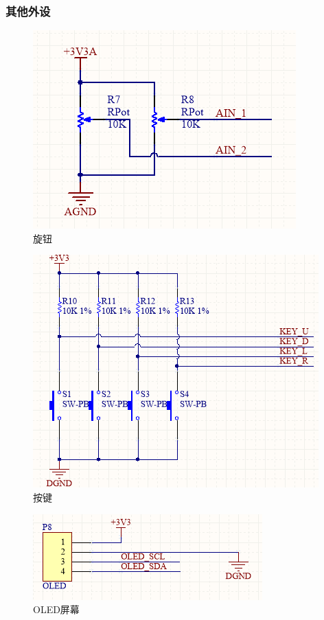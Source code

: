 \documentclass[16pt,a4paper]{article}
\begin{document}
\subsubsection{其他外设}
\begin{figure}[H]
\centering
\includegraphics[scale = 0.8]{Rpot.png}
\caption{旋钮} 
\end{figure}


\begin{figure}[H]
\centering
\includegraphics[scale = 0.8]{key.png}
\caption{按键} 
\end{figure}

\begin{figure}[H]
\centering
\includegraphics[scale = 0.8]{oled.png}
\caption{OLED屏幕} 
\end{figure}
\end{document}
